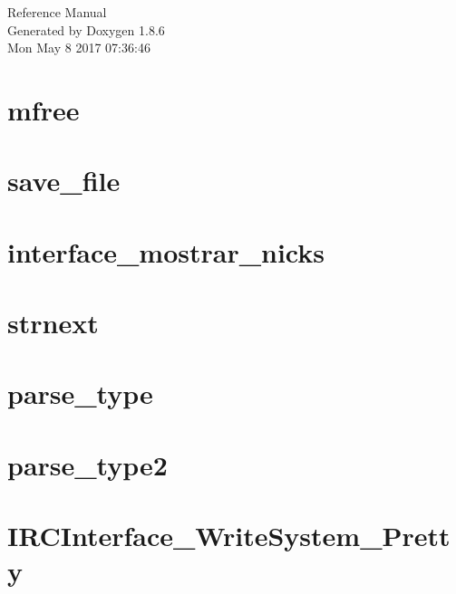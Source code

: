 \documentclass[twoside]{book}
\newcommand{\clearemptydoublepage}{%
  \newpage{\pagestyle{empty}\cleardoublepage}%
}
\begin{document}
\hypersetup{pageanchor=false}
\begin{titlepage}
\vspace*{7cm}
\begin{center}%
{\Large Reference Manual}\\
\vspace*{1cm}
{\large Generated by Doxygen 1.8.6}\\
\vspace*{0.5cm}
{\small Mon May 8 2017 07:36:46}\\
\end{center}
\end{titlepage}
\clearemptydoublepage
\tableofcontents
\clearemptydoublepage
{}
\hypersetup{pageanchor=true}

\chapter{mfree}
\label{mfree}
\hypertarget{mfree}{}

\chapter{save\-\_\-file}
\label{save_file}
\hypertarget{save_file}{}

\chapter{interface\-\_\-mostrar\-\_\-nicks}
\label{interface_mostrar_nicks}
\hypertarget{interface_mostrar_nicks}{}

\chapter{strnext}
\label{strnext}
\hypertarget{strnext}{}

\chapter{parse\-\_\-type}
\label{parse_type}
\hypertarget{parse_type}{}

\chapter{parse\-\_\-type2}
\label{parse_type2}
\hypertarget{parse_type2}{}

\chapter{I\-R\-C\-Interface\-\_\-\-Write\-System\-\_\-\-Pretty}
\label{_i_r_c_interface__write_system__pretty}
\hypertarget{_i_r_c_interface__write_system__pretty}{}

\end{document}

